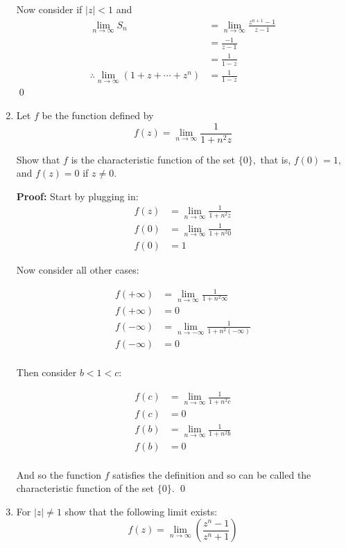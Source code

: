 \begin{enumerate}
	Now consider if $|z| < 1$ and 
	\begin{align*}
		\lim_{n \to \infty} S_n &= \lim_{n \to \infty} \frac{z^{n +1} - 1}{z - 1} \\
		&=  \frac{- 1}{z - 1} \\
		&=  \frac{1}{1 - z} \\
		\therefore \lim_{n \to \infty} (1 + z + \cdots + z^n ) &= \frac{1}{1 - z}
	\end{align*}
	\qed

	\item Let $f$ be the function defined by
	\[ f(z) = \lim_{n \to \infty} \frac{1}{1 + n^2 z} \]

	Show that $f$ is the characteristic function of the set $\{0\},$ that is, $f(0) = 1,$ and $f(z) = 0$ if $z \neq 0.$
			
	\textbf{Proof:}
	Start by plugging in:
	\begin{align*}
		f(z) &= \lim_{n \to \infty} \frac{1}{1 + n^2 z} \\
		f(0) &= \lim_{n \to \infty} \frac{1}{1 + n^2 0} \\
		f(0) &= 1 
	\end{align*}

	Now consider all other cases:

	\begin{align*}
		f(+\infty) &= \lim_{n \to \infty} \frac{1}{1 + n^2 \infty} \\
		f(+\infty) &= 0 \\
		f(-\infty) &= \lim_{n \to -\infty} \frac{1}{1 + n^2 (-\infty)} \\ 
		f(-\infty) &= 0 \\
	\end{align*}

	Then consider $b < 1 < c$:

	\begin{align*}
		f(c) &= \lim_{n \to \infty} \frac{1}{1 + n^2 c} \\
		f(c) &= 0 \\
		f(b) &= \lim_{n \to \infty} \frac{1}{1 + n^2 b} \\ 
		f(b) &= 0 \\
	\end{align*}

	And so the function $f$ satisfies the definition and so can be called the characteristic function of the set $\{0\}$.
	\qed

	\item For $|z| \neq 1$ show that the following limit exists:
	\[ f(z) = \lim_{n \to \infty} \left( \frac{z^n - 1}{z^n + 1} \right) \]


\end{enumerate}
